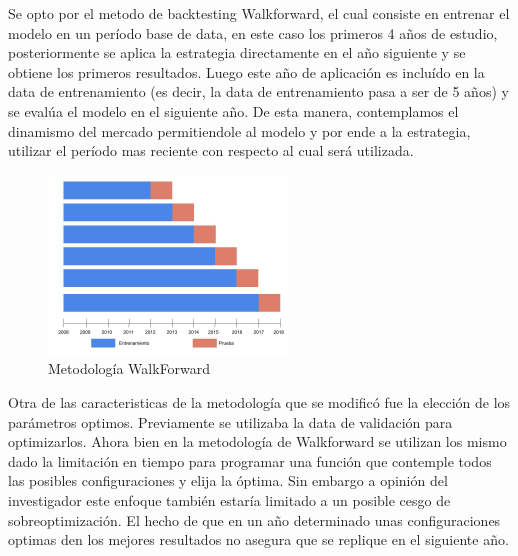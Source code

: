 \documentclass[a4paper,12pt]{Latex/Classes/PhDthesisPSnPDF}
\begin{document}
Se opto por el metodo de backtesting Walkforward, el cual consiste en entrenar el modelo en un período base de data, en este caso los primeros 4 años de estudio, posteriormente se aplica la estrategia directamente en el año siguiente y se obtiene los primeros resultados. Luego este año de aplicación es incluído en la data de entrenamiento (es decir, la data de entrenamiento pasa a ser de 5 años) y se evalúa el modelo en el siguiente año. De esta manera, contemplamos el dinamismo del mercado permitiendole al modelo y por ende a la estrategia, utilizar el período mas reciente con respecto al cual será utilizada.

\begin{figure}[ht]
\begin{center}
\includegraphics[width=2.5in]{images/walkforward_plot}
\end{center}
\caption{Metodología WalkForward}
\end{figure}

Otra de las caracteristicas de la metodología que se modificó fue la elección de los parámetros optimos. Previamente se utilizaba la data de validación para optimizarlos. Ahora bien en la metodología de Walkforward se utilizan los mismo dado la limitación en tiempo para programar una función que contemple todos las posibles configuraciones y elija la óptima. Sin embargo a opinión del investigador este enfoque también estaría limitado a un posible cesgo de sobreoptimización. El hecho de que en un año determinado unas configuraciones optimas den los mejores resultados no asegura que se replique en el siguiente año.

% 
\end{document}
